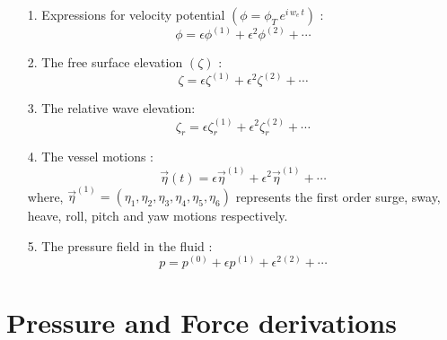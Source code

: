 \begin{itemize}
    \item [1.] Expressions for velocity potential $\left(\phi = \phi_T\,e^{i\,w_e\,t}\right)$ :
    \begin{equation}
        \phi = \epsilon \phi^{(1)} + \epsilon^2 \phi^{(2)} + \cdots
    \end{equation}

    \item [2.] The free surface elevation $(\zeta)$ :
    \begin{equation}
        \zeta = \epsilon \zeta^{(1)} + \epsilon^2 \zeta^{(2)} + \cdots
    \end{equation}

    \item [3.] The relative wave elevation:
    \begin{equation}
        \zeta_r = \epsilon \zeta_r^{(1)} + \epsilon^2 \zeta_r^{(2)} + \cdots
    \end{equation}

    \item [4.] The vessel motions :
    \begin{equation}
        \vec{\eta}(t) = \epsilon \vec{\eta}^{(1)} + \epsilon^2 \vec{\eta}^{(1)} + \cdots
    \end{equation}
    where, $\vec{\eta}^{(1)} = (\eta_1, \eta_2, \eta_3, \eta_4, \eta_5, \eta_6)$ represents the first order surge, 
    sway, heave, roll, pitch and yaw motions respectively.

    \item [5.] The pressure field in the fluid :
    \begin{equation}
        \label{eq:per_perssure}
        p = p^{(0)} + \epsilon p^{(1)} + \epsilon^{2} {^{(2)}} + \cdots
    \end{equation}
\end{itemize}



\section{Pressure and Force derivations}


